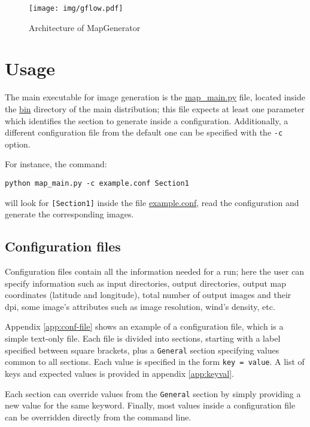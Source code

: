 \documentclass[11pt]{article}
\newcommand{\mg}{MapGenerator}
\begin{document}
\begin{figure}[H]
\begin{center}
\texttt{[image: img/gflow.pdf]}
\end{center}
\caption{Architecture of \mg{}}
\label{fig:wflow}
\end{figure}

\section{Usage}
The main executable for image generation is the \url{map_main.py} file, located inside the \url{bin} directory of the main distribution; this file expects at least one parameter which identifies the section to generate inside a configuration. 
Additionally, a different configuration file from the default one can be specified with the \texttt{-c} option.

For instance, the command: 
\begin{center}
\begin{verbatim}
python map_main.py -c example.conf Section1 
\end{verbatim}
\end{center}
will look for \texttt{[Section1]} inside the file \url{example.conf}, read the configuration and generate the corresponding images. 


\subsection{Configuration files}
Configuration files contain all the information needed for a run; here the user can specify information such as input directories, output directories, output map coordinates (latitude and longitude), total number of output images and their dpi, some image's attributes such as image resolution, wind's density, etc. 

Appendix \ref{app:conf-file} shows an example of a configuration file, which is a simple text-only file. Each file is divided into sections, starting with a label specified between square brackets, plus a \texttt{General} section specifying values common to all sections. Each value is specified in the form \texttt{key = value}. A list of keys and expected values is provided in appendix \ref{app:keyval}. 

Each section can override values from the \texttt{General} section by simply providing a new value for the same keyword. Finally, most values inside a configuration file can be overridden directly from the command line. 
\end{document}
